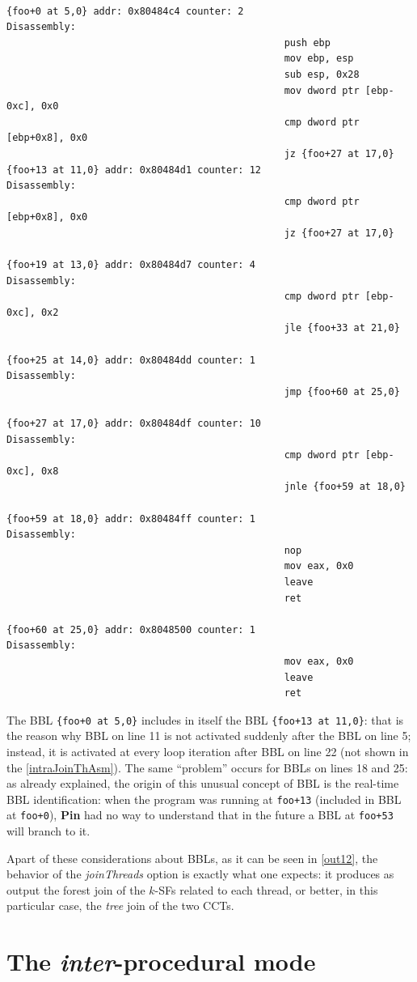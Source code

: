 \documentclass[a4paper,10pt]{report}
\begin{document}
\begin{lstlisting}[language={[x86masm]Assembler}, 
	label=intraJoinThAsm, caption={a part of ``all basic blocks'' table of \texttt{prog5}}]

{foo+0 at 5,0} addr: 0x80484c4 counter: 2   
Disassembly:
												push ebp
												mov ebp, esp
												sub esp, 0x28
												mov dword ptr [ebp-0xc], 0x0
												cmp dword ptr [ebp+0x8], 0x0
												jz {foo+27 at 17,0}
{foo+13 at 11,0} addr: 0x80484d1 counter: 12
Disassembly: 
												cmp dword ptr [ebp+0x8], 0x0
												jz {foo+27 at 17,0}

{foo+19 at 13,0} addr: 0x80484d7 counter: 4
Disassembly: 
												cmp dword ptr [ebp-0xc], 0x2
												jle {foo+33 at 21,0}

{foo+25 at 14,0} addr: 0x80484dd counter: 1
Disassembly: 
												jmp {foo+60 at 25,0}

{foo+27 at 17,0} addr: 0x80484df counter: 10
Disassembly: 
												cmp dword ptr [ebp-0xc], 0x8
												jnle {foo+59 at 18,0}

{foo+59 at 18,0} addr: 0x80484ff counter: 1
Disassembly: 
												nop 
												mov eax, 0x0
												leave 
												ret 

{foo+60 at 25,0} addr: 0x8048500 counter: 1 
Disassembly: 
												mov eax, 0x0
												leave 
												ret 

\end{lstlisting}

The BBL \verb|{foo+0 at 5,0}| includes in itself the BBL \verb|{foo+13 at 11,0}|: 
that is the reason why BBL on line 11 is not activated suddenly 
after the BBL on line 5; instead, it is activated at every loop iteration 
after BBL on line 22 (not shown in the \cref{intraJoinThAsm}). 
The same ``problem'' occurs for BBLs on lines 18 and 25: 
as already explained, the origin of this unusual concept of BBL is the real-time BBL 
identification: when the program was running at \verb|foo+13| (included in BBL at \verb|foo+0|),
\textbf{Pin} had no way to understand that in the future a BBL at \verb|foo+53| will 
branch to it.

Apart of these considerations about BBLs, as it can be seen in \cref{out12},
the behavior of the \emph{joinThreads} option is exactly what one expects: 
it produces as output the forest join of the $k$-SFs related to each thread, 
or better, in this particular case, the \emph{tree} join of the two CCTs.

\section{The \emph{inter}-procedural mode}
\end{document}
